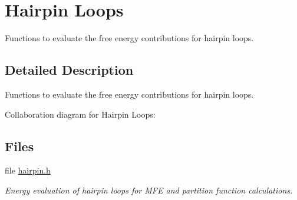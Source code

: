 \hypertarget{group__eval__loops__hp}{}\section{Hairpin Loops}
\label{group__eval__loops__hp}


Functions to evaluate the free energy contributions for hairpin loops.  




\subsection{Detailed Description}
Functions to evaluate the free energy contributions for hairpin loops. 

Collaboration diagram for Hairpin Loops\+:
\subsection*{Files}
\begin{DoxyCompactItemize}
\item 
file \mbox{\hyperlink{hairpin_8h}{hairpin.\+h}}
\begin{DoxyCompactList}\small\item\em Energy evaluation of hairpin loops for M\+FE and partition function calculations. \end{DoxyCompactList}\end{DoxyCompactItemize}
